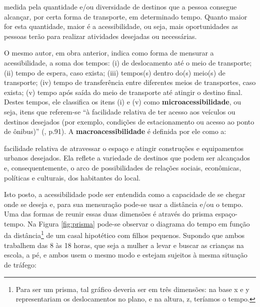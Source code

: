 \begin{citacao}
medida pela quantidade e/ou diversidade de destinos que a pessoa consegue alcançar, por certa forma de transporte, em determinado tempo. Quanto maior for esta quantidade, maior é a acessibilidade, ou seja, mais oportunidades as pessoas terão para realizar atividades desejadas ou necessárias. \cite[p.42]{VASCONCELLOS2012}
\end{citacao}

O mesmo autor, em obra anterior, indica como forma de mensurar a acessibilidade, a soma dos tempos: (i) de deslocamento até o meio de transporte; (ii) tempo de espera, caso exista; (iii) tempos(s) dentro do(s) meio(s) de transporte; (iv) tempo de transferência entre diferentes meios de transportes, caso exista; (v) tempo após saída do meio de transporte até atingir o destino final. Destes tempos, ele classifica os itens (i) e (v) como \textbf{microacessibilidade}, ou seja, itens que referem-se ``à facilidade relativa de ter acesso aos veículos ou destinos desejados (por exemplo, condições de estacionamento ou acesso ao ponto de ônibus)'' (\citeyear{VASCONCELLOS2001}, p.91). A \textbf{macroacessibilidade} é definida por ele como a:

\begin{citacao}
facilidade relativa de atravessar o espaço e atingir construções e equipamentos urbanos desejados. Ela reflete a variedade de destinos que podem ser alcançados e, consequentemente, o arco de possibilidades de relações sociais, econômicas, políticas e culturais, dos habitantes do local. \cite[p.91]{VASCONCELLOS2001}
\end{citacao}

Isto posto, a acessibilidade pode ser entendida como a capacidade de se chegar onde se deseja e, para sua mensuração pode-se usar a distância e/ou o tempo. Uma das formas de reunir essas duas dimensões é através do prisma espaço-tempo. Na Figura \ref{fig:prisma} pode-se observar o diagrama do tempo em função da distância\footnote{Para ser um prisma, tal gráfico deveria ser em três dimensões: na base x e y representariam os deslocamentos no plano, e na altura, z, teríamos o tempo.} de um casal hipotético com filhos pequenos. Supondo que ambos trabalhem das 8 às 18 horas, que seja a mulher a levar e buscar as crianças na escola, a pé, e ambos usem o mesmo modo e estejam sujeitos à mesma situação de tráfego:

